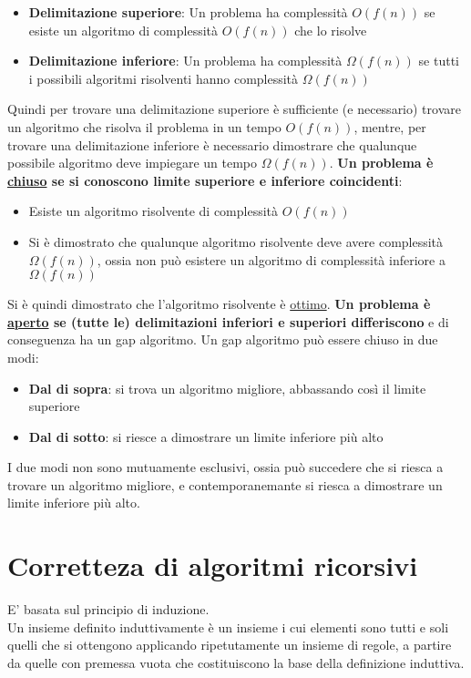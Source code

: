 \documentclass[12pt, a4paper]{report}
\begin{document}
\textbf{}
\begin{itemize}
    \item \textbf{Delimitazione superiore}: Un problema ha complessità $O(f(n))$ se esiste un algoritmo di complessità $O(f(n))$ che lo risolve
    \item \textbf{Delimitazione inferiore}: Un problema ha complessità $\Omega(f(n))$ se tutti i possibili algoritmi risolventi hanno complessità $\Omega(f(n))$
\end{itemize}
Quindi per trovare una delimitazione superiore è sufficiente (e necessario) trovare un algoritmo che risolva il problema in un tempo $O(f(n))$, mentre, per trovare una delimitazione inferiore è necessario dimostrare che qualunque possibile algoritmo deve impiegare un tempo $\Omega(f(n))$. \textbf{Un problema è \underline{chiuso} se si conoscono limite superiore e inferiore coincidenti}:
\begin{itemize}
    \item Esiste un algoritmo risolvente di complessità $O(f(n))$
    \item Si è dimostrato che qualunque algoritmo risolvente deve avere complessità $\Omega(f(n))$, ossia non può esistere un algoritmo di complessità inferiore a $\Omega(f(n))$
\end{itemize}
Si è quindi dimostrato che l'algoritmo risolvente è \underline{ottimo}. \textbf{Un problema è \underline{aperto} se (tutte le) delimitazioni inferiori e superiori differiscono} e di conseguenza ha un gap algoritmo. Un gap algoritmo può essere chiuso in due modi:
\begin{itemize}
    \item \textbf{Dal di sopra}: si trova un algoritmo migliore, abbassando così il limite superiore
    \item \textbf{Dal di sotto}: si riesce a dimostrare un limite inferiore più alto
\end{itemize}
I due modi non sono mutuamente esclusivi, ossia può succedere che si riesca a trovare un algoritmo migliore, e contemporanemante si riesca a dimostrare un limite inferiore più alto.
\section{Corretteza di algoritmi ricorsivi}
E' basata sul principio di induzione.\\
Un insieme definito induttivamente è un insieme i cui elementi sono tutti e soli quelli che si ottengono applicando ripetutamente un insieme di regole, a partire da quelle con premessa vuota che costituiscono la base della definizione induttiva.
\end{document}
